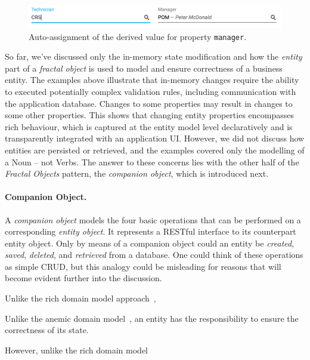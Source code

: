 \documentclass[a4paper,12pt,oneside,openright,final]{memoir} %
\begin{document}
	\begin{figure}[!h]
  		\centering
      	\includegraphics[width=1.0\textwidth]{images/05-wa-technician-entered.png}  
   	  	\caption{Auto-assignment of the derived value for property \texttt{manager}.}
   		\label{fig:derived-manager}
  	\end{figure}
	
	
	So far, we've discussed only the in-memory state modification and how the \emph{entity} part of a \emph{fractal object} is used to model and ensure correctness of a business entity.
	The examples above illustrate that in-memory changes require the ability to executed potentially complex validation rules, including communication with the application database.
	Changes to some properties may result in changes to some other properties.
	This shows that changing entity properties encompasses rich behaviour, which is captured at the entity model level declaratively and is transparently integrated with an application UI.
	However, we did not discuss how entities are persisted or retrieved, and the examples covered only the modelling of a Noun -- not Verbs.
	The answer to these concerns lies with the other half of the \emph{Fractal Objects} pattern, the \emph{companion object}, which is introduced next.


	\iffalse
	

	\paragraph{Companion Object.}	
	A \emph{companion object} models the four basic operations that can be performed on a corresponding \emph{entity object}.
	It represents a RESTful interface to its counterpart entity object.
	Only by means of a companion object could an entity be \emph{created}, \emph{saved}, \emph{deleted}, and \emph{retrieved} from a database.
	One could think of these operations as simple CRUD, but this analogy could be misleading for reasons that will become evident further into the discussion.
	

	Unlike the rich domain model approach~\cite{evans2003},


	Unlike the anemic domain model~\cite{fowler2003}, an entity has the responsibility to ensure the correctness of its state.
	
	However, unlike the rich domain model
	
\end{document}
